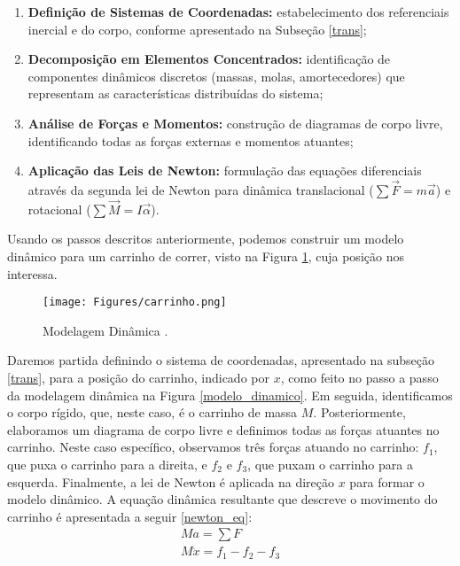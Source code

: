 \begin{enumerate}
\item \textbf{Definição de Sistemas de Coordenadas:} estabelecimento dos referenciais inercial e do corpo, conforme apresentado na Subseção \ref{trans};

\item \textbf{Decomposição em Elementos Concentrados:} identificação de componentes dinâmicos discretos (massas, molas, amortecedores) que representam as características distribuídas do sistema;

\item \textbf{Análise de Forças e Momentos:} construção de diagramas de corpo livre, identificando todas as forças externas e momentos atuantes;

\item \textbf{Aplicação das Leis de Newton:} formulação das equações diferenciais através da segunda lei de Newton para dinâmica translacional ($\sum \vec{F} = m\vec{a}$) e rotacional ($\sum \vec{M} = I\vec{\alpha}$).
\end{enumerate}

Usando os passos descritos anteriormente, podemos construir um modelo dinâmico para um carrinho de correr, visto na Figura \ref{carrinho}, cuja posição nos interessa. 

\begin{figure}[H]
\centering
\texttt{[image: Figures/carrinho.png]}
\caption{Modelagem Dinâmica \cite[Week 4 - Lesson 3: Dynamic Modeling in 2D. ~4min20s]{University_of_Toronto2018-fe}.}
\label{carrinho}
\end{figure}


Daremos partida definindo o sistema de coordenadas, apresentado na subseção \ref{trans}, para a posição do carrinho, indicado por $x$, como feito no passo a passo da modelagem dinâmica na Figura \ref{modelo_dinamico}. Em seguida, identificamos o corpo rígido, que, neste caso, é o carrinho de massa $M$. Posteriormente, elaboramos um diagrama de corpo livre e definimos todas as forças atuantes no carrinho. Neste caso específico, observamos três forças atuando no carrinho: $f_1$, que puxa o carrinho para a direita, e $f_2$ e $f_3$, que puxam o carrinho para a esquerda.
Finalmente, a lei de Newton é aplicada na direção $x$ para formar o modelo dinâmico. A equação dinâmica resultante que descreve o movimento do carrinho é apresentada a seguir \ref{newton_eq}: 
\begin{equation} \label{newton_eq}
\begin{aligned}
Ma = \sum F \\
M\ddot{x} = f_1 - f_2 - f_3 \\
\end{aligned}
\end{equation} 


